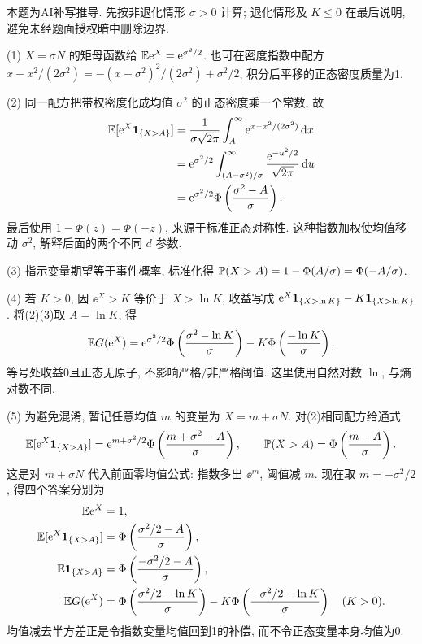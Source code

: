 \begin{solution}
本题为AI补写推导. 先按非退化情形 $\sigma>0$ 计算; 退化情形及 $K\leq0$ 在最后说明, 避免未经题面授权暗中删除边界.

(1)\label{sol:flp-VI-1} $X=\sigma N$ 的矩母函数给 $\mathbb E\mathrm e^X=\mathrm e^{\sigma^2/2}$. 也可在密度指数中配方 $x-x^2/(2\sigma^2)=-(x-\sigma^2)^2/(2\sigma^2)+\sigma^2/2$, 积分后平移的正态密度质量为1.

(2)\label{sol:flp-VI-2} 同一配方把带权密度化成均值 $\sigma^2$ 的正态密度乘一个常数, 故
\begin{align*}
\mathbb E[\mathrm e^X\mathbf 1_{\{X>A\}}]
&=\frac1{\sigma\sqrt{2\pi}}\int_A^\infty\mathrm e^{x-x^2/(2\sigma^2)}\,\mathrm d x\\
&=\mathrm e^{\sigma^2/2}\int_{(A-\sigma^2)/\sigma}^\infty\frac{\mathrm e^{-u^2/2}}{\sqrt{2\pi}}\,\mathrm d u\\
&=\mathrm e^{\sigma^2/2}\Phi\left(\frac{\sigma^2-A}{\sigma}\right).
\end{align*}
最后使用 $1-\Phi(z)=\Phi(-z)$, 来源于标准正态对称性. 这种指数加权使均值移动 $\sigma^2$, 解释后面的两个不同 $d$ 参数.

(3)\label{sol:flp-VI-3} 指示变量期望等于事件概率, 标准化得 $\mathbb P(X>A)=1-\Phi(A/\sigma)=\Phi(-A/\sigma)$.

(4)\label{sol:flp-VI-4} 若 $K>0$, 因 $\ee^X>K$ 等价于 $X>\ln K$, 收益写成 $\mathrm e^X\mathbf 1_{\{X>\ln K\}}-K\mathbf 1_{\{X>\ln K\}}$. 将(2)(3)取 $A=\ln K$, 得
\[\mathbb E G(\mathrm e^X)=\mathrm e^{\sigma^2/2}\Phi\left(\frac{\sigma^2-\ln K}{\sigma}\right)
-K\Phi\left(\frac{-\ln K}{\sigma}\right).\]
等号处收益0且正态无原子, 不影响严格/非严格阈值. 这里使用自然对数 $\ln$, 与熵对数不同.

(5)\label{sol:flp-VI-5} 为避免混淆, 暂记任意均值 $m$ 的变量为 $X=m+\sigma N$. 对(2)相同配方给通式
\[\mathbb E[\mathrm e^X\mathbf 1_{\{X>A\}}]=\mathrm e^{m+\sigma^2/2}\Phi\left(\frac{m+\sigma^2-A}{\sigma}\right),\qquad
\mathbb P(X>A)=\Phi\left(\frac{m-A}{\sigma}\right).\]
这是对 $m+\sigma N$ 代入前面零均值公式: 指数多出 $\ee^m$, 阈值减 $m$. 现在取 $m=-\sigma^2/2$, 得四个答案分别为
\begin{align*}
\mathbb E\mathrm e^X&=1,\\
\mathbb E[\mathrm e^X\mathbf 1_{\{X>A\}}]&=\Phi\left(\frac{\sigma^2/2-A}{\sigma}\right),\\
\mathbb E\mathbf 1_{\{X>A\}}&=\Phi\left(\frac{-\sigma^2/2-A}{\sigma}\right),\\
\mathbb E G(\mathrm e^X)&=\Phi\left(\frac{\sigma^2/2-\ln K}{\sigma}\right)
-K\Phi\left(\frac{-\sigma^2/2-\ln K}{\sigma}\right)\quad(K>0).
\end{align*}
均值减去半方差正是令指数变量均值回到1的补偿, 而不令正态变量本身均值为0.


\end{solution}
